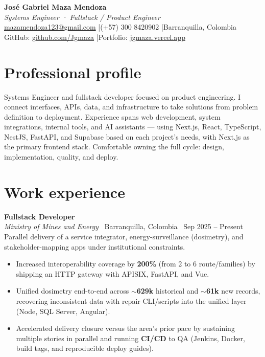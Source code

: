 \documentclass[10.5pt,a4paper]{article}
\newcommand{\Job}[4]{%
  \noindent\textbf{#1}\\[-0.05em]
  {\small\textit{#2} \textbar\ #4 \textbar\ #3}\\[0.15em]
}
\begin{document}
\begin{center}
  {\LARGE\bfseries José Gabriel Maza Mendoza}\\[0.25em]
  {\large\textit{Systems Engineer · Fullstack / Product Engineer}}\\[0.45em]
  {\small
    \href{mailto:mazamendoza123@gmail.com}{mazamendoza123@gmail.com}
    \quad|\quad (+57) 300 8420902
    \quad|\quad Barranquilla, Colombia
  }\\[0.15em]
  {\small
    GitHub: \href{https://github.com/Jgmaza}{github.com/Jgmaza}
    \quad|\quad Portfolio: \href{https://jgmaza.vercel.app}{jgmaza.vercel.app}
  }
\end{center}

\section{Professional profile}
Systems Engineer and fullstack developer focused on product engineering. I connect
interfaces, APIs, data, and infrastructure to take solutions from problem definition
to deployment. Experience spans web development, system integrations, internal tools,
and AI assistants --- using Next.js, React, TypeScript, NestJS, FastAPI, and Supabase
based on each project's needs, with Next.js as the primary frontend stack. Comfortable
owning the full cycle: design, implementation, quality, and deploy.

\section{Work experience}

\Job{Fullstack Developer}{Ministry of Mines and Energy}{Sep 2025 -- Present}{Barranquilla, Colombia}
Parallel delivery of a service integrator, energy-surveillance (dosimetry), and
stakeholder-mapping apps under institutional constraints.
\begin{itemize}
  \item Increased interoperability coverage by \textbf{200\%} (from 2 to 6 route/families)
        by shipping an HTTP gateway with APISIX, FastAPI, and Vue.
  \item Unified dosimetry end-to-end across $\sim$\textbf{629k} historical and
        $\sim$\textbf{61k} new records, recovering inconsistent data with repair
        CLI/scripts into the unified layer (Node, SQL Server, Angular).
  \item Accelerated delivery closure versus the area's prior pace by sustaining multiple
        stories in parallel and running \textbf{CI/CD} to QA (Jenkins, Docker, build tags,
        and reproducible deploy guides).
\end{itemize}
\end{document}

